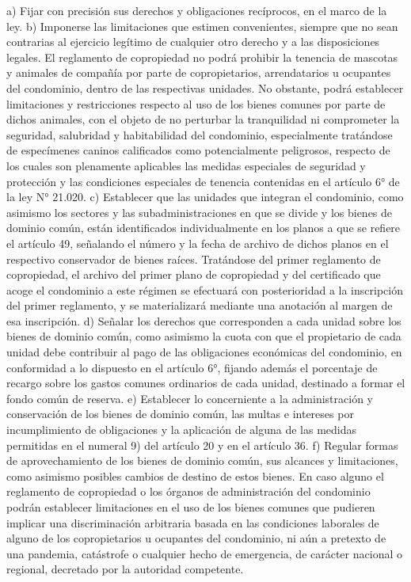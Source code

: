     a) Fijar con precisión sus derechos y obligaciones recíprocos, en el marco de la ley.
    b) Imponerse las limitaciones que estimen convenientes, siempre que no sean contrarias al ejercicio legítimo de cualquier otro derecho y a las disposiciones legales. El reglamento de copropiedad no podrá prohibir la tenencia de mascotas y animales de compañía por parte de copropietarios, arrendatarios u ocupantes del condominio, dentro de las respectivas unidades. No obstante, podrá establecer limitaciones y restricciones respecto al uso de los bienes comunes por parte de dichos animales, con el objeto de no perturbar la tranquilidad ni comprometer la seguridad, salubridad y habitabilidad del condominio, especialmente tratándose de especímenes caninos calificados como potencialmente peligrosos, respecto de los cuales son plenamente aplicables las medidas especiales de seguridad y protección y las condiciones especiales de tenencia contenidas en el artículo 6° de la ley N° 21.020.
    c) Establecer que las unidades que integran el condominio, como asimismo los sectores y las subadministraciones en que se divide y los bienes de dominio común, están identificados individualmente en los planos a que se refiere el artículo 49, señalando el número y la fecha de archivo de dichos planos en el respectivo conservador de bienes raíces. Tratándose del primer reglamento de copropiedad, el archivo del primer plano de copropiedad y del certificado que acoge el condominio a este régimen se efectuará con posterioridad a la inscripción del primer reglamento, y se materializará mediante una anotación al margen de esa inscripción.
    d) Señalar los derechos que corresponden a cada unidad sobre los bienes de dominio común, como asimismo la cuota con que el propietario de cada unidad debe contribuir al pago de las obligaciones económicas del condominio, en conformidad a lo dispuesto en el artículo 6°, fijando además el porcentaje de recargo sobre los gastos comunes ordinarios de cada unidad, destinado a formar el fondo común de reserva.
    e) Establecer lo concerniente a la administración y conservación de los bienes de dominio común, las multas e intereses por incumplimiento de obligaciones y la aplicación de alguna de las medidas permitidas en el numeral 9) del artículo 20 y en el artículo 36.
    f) Regular formas de aprovechamiento de los bienes de dominio común, sus alcances y limitaciones, como asimismo posibles cambios de destino de estos bienes. En caso alguno el reglamento de copropiedad o los órganos de administración del condominio podrán establecer limitaciones en el uso de los bienes comunes que pudieren implicar una discriminación arbitraria basada en las condiciones laborales de alguno de los copropietarios u ocupantes del condominio, ni aún a pretexto de una pandemia, catástrofe o cualquier hecho de emergencia, de carácter nacional o regional, decretado por la autoridad competente.
